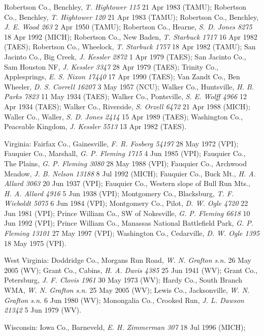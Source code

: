 \documentclass{article}
\begin{document}
Robertson Co., Benchley, \textit{T. Hightower 115} 21 Apr 1983 (TAMU); 
Robertson Co., Benchley, \textit{T. Hightower 120} 21 Apr 1983 (TAMU); 
Robertson Co., Benchley, \textit{J. E. Wood 263} 2 Apr 1950 (TAMU); 
Robertson Co., Hearne, \textit{S. D. Jones 8275} 18 Apr 1992 (MICH); 
Robertson Co., New Baden, \textit{T. Starbuck 1717} 16 Apr 1982 (TAES); 
Robertson Co., Wheelock, \textit{T. Starbuck 1757} 18 Apr 1982 (TAMU); 
San Jacinto Co., Big Creek, \textit{J. Kessler 2872} 1 Apr 1979 (TAES); 
San Jacinto Co., Sam Houston NF, \textit{J. Kessler 3347} 28 Apr 1979 (TAES); 
Trinity Co., Applesprings, \textit{E. S. Nixon 17440} 17 Apr 1990 (TAES); 
Van Zandt Co., Ben Wheeler, \textit{D. S. Correll 16207} 3 May 1957 (NCU); 
Walker Co., Huntsville, \textit{H. B. Parks 7823} 11 May 1934 (TAES); 
Walker Co., Pontsville, \textit{S. E. Wolff 4966} 12 Apr 1934 (TAES); 
Walker Co., Riverside, \textit{S. Orzell 6472} 21 Apr 1988 (MICH); 
Waller Co., Waller, \textit{S. D. Jones 2414} 15 Apr 1989 (TAES); 
Washington Co., Peaceable Kingdom, \textit{J. Kessler 5513} 13 Apr 1982 (TAES). 

Virginia:
Fairfax Co., Gainesville, \textit{F. R. Fosberg 54197} 28 May 1972 (VPI); 
Fauquier Co., Marshall, \textit{G. P. Fleming 1715} 4 Jun 1985 (VPI); 
Fauquier Co., The Plains, \textit{G. P. Fleming 3080} 28 May 1988 (VPI); 
Fauquier Co., Archwood Meadow, \textit{J. B. Nelson 13188} 8 Jul 1992 (MICH); 
Fauquier Co., Buck Mt., \textit{H. A. Allard 3063} 20 Jun 1937 (VPI); 
Fauquier Co., Western slope of Bull Run Mts., \textit{H. A. Allard 4916} 5 Jun 1938 (VPI); 
Montgomery Co., Blacksburg, \textit{T. F. Wieboldt 5075} 6 Jun 1984 (VPI); 
Montgomery Co., Pilot, \textit{D. W. Ogle 4720} 22 Jun 1981 (VPI); 
Prince William Co., SW of Nokesville, \textit{G. P. Fleming 6618} 10 Jun 1992 (VPI); 
Prince William Co., Manassas National Battlefield Park, \textit{G. P. Fleming 13101} 27 May 1997 (VPI); 
Washington Co., Cedarville, \textit{D. W. Ogle 1395} 18 May 1975 (VPI). 

West Virginia:
Doddridge Co., Morgans Run Road, \textit{W. N. Grafton s.n.} 26 May 2005 (WV); 
Grant Co., Cabins, \textit{H. A. Davis 4385} 25 Jun 1941 (WV); 
Grant Co., Petersburg, \textit{J. F. Clovis 1961} 30 May 1973 (WV); 
Hardy Co., South Branch WMA, \textit{W. N. Grafton s.n.} 25 May 2005 (WV); 
Lewis Co., Jacksonville, \textit{W. N. Grafton s.n.} 6 Jun 1980 (WV); 
Monongalia Co., Crooked Run, \textit{J. L. Dawson 21342} 5 Jun 1979 (WV). 

Wisconsin:
Iowa Co., Barneveld, \textit{E. H. Zimmerman 307} 18 Jul 1996 (MICH); 
\end{document}
